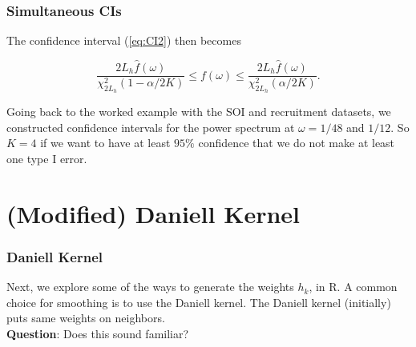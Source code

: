 \documentclass[%
xcolor=pdftex]{beamer}
\begin{document}
\begin{frame}
\frametitle{Simultaneous CIs}

The confidence interval (\ref{eq:CI2}) then becomes

\begin{equation} \label{eq:CI3}
\frac{2 L_h   \widehat{f}(\omega)}{{\chi_{2L_h}^2(1-\alpha/2K)}} \leq f(\omega) \leq \frac{2 L_h  \widehat{f}(\omega) }{{\chi_{2L_h}^2(\alpha/2K)}} .
\end{equation}

Going back to the worked example with the SOI and recruitment datasets, we constructed confidence intervals for the power spectrum at $\omega = 1/48$ and $1/12$. So $K=4$ if we want to have at least $95\%$ confidence that we do not make at least one type I error.

\end{frame}





\section{(Modified) Daniell Kernel}
\frame{\tableofcontents[currentsection]}

\begin{frame}
\frametitle{Daniell Kernel}

Next, we explore some of the ways to generate the weights $h_k$, in R. A common choice for smoothing is to use the Daniell kernel. The Daniell kernel (initially) puts same
weights on neighbors.\\
\vspace{5mm}
\textbf{Question}: Does this sound familiar?

\end{frame}
\end{document}
